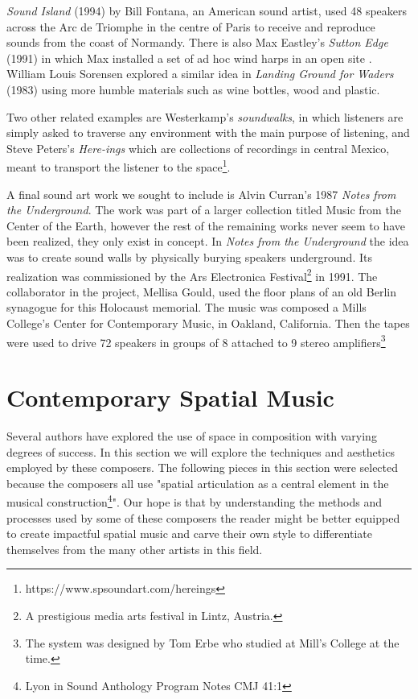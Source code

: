 \textit{Sound Island} (1994) by Bill Fontana, an American sound artist, used 48 speakers across the Arc de Triomphe in the centre of Paris to receive and reproduce sounds from the coast of Normandy. There is also Max Eastley's \textit{Sutton Edge} (1991) in which Max installed a set of ad hoc wind harps in an open site \cite{ray2006soundscapes}. William Louis Sorensen explored a similar idea in \textit{Landing Ground for Waders} (1983) using more humble materials such as wine bottles, wood and plastic. 

Two other related examples are Westerkamp's \textit{soundwalks}, in which listeners are simply asked to traverse any environment with the main purpose of listening, and Steve Peters’s \textit{Here-ings} which are collections of recordings in central Mexico, meant to transport the listener to the space\footnote{https://www.spsoundart.com/hereings}. 

A final sound art work we sought to include is Alvin Curran's 1987 \textit{Notes from the Underground}. The work was part of a larger collection titled Music from the Center of the Earth, however the rest of the remaining works never seem to have been realized, they only exist in concept. In \textit{Notes from the Underground} the idea was to create sound walls by physically burying speakers underground. Its realization was commissioned by the Ars Electronica Festival\footnote{A prestigious media arts festival in Lintz, Austria.} in 1991. The collaborator in the project, Mellisa Gould, used the floor plans of an old Berlin synagogue for this Holocaust memorial. The music was composed a Mills College's Center for Contemporary Music, in Oakland, California. Then the tapes were used to drive 72 speakers in groups of 8 attached to 9 stereo amplifiers\cite{curran1994music}\footnote{The system was designed by Tom Erbe who studied at Mill's College at the time.}



\section{Contemporary Spatial Music} \label{sec:contemp_works}

Several authors have explored the use of space in composition with varying degrees of success. In this section we will explore the techniques and aesthetics employed by these composers. The following pieces in this section were selected because the composers all use "spatial articulation as a central element in the musical construction\footnote{Lyon in Sound Anthology Program Notes CMJ 41:1}". Our hope is that by understanding the methods and processes used by some of these composers the reader might be better equipped to create impactful spatial music and carve their own style to differentiate themselves from the many other artists in this field.

